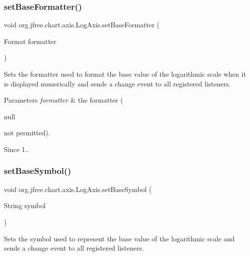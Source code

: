 \subsubsection{\texorpdfstring{set\+Base\+Formatter()}{setBaseFormatter()}}
{\footnotesize\ttfamily void org.\+jfree.\+chart.\+axis.\+Log\+Axis.\+set\+Base\+Formatter (\begin{DoxyParamCaption}\item[{Format}]{formatter }\end{DoxyParamCaption})}

Sets the formatter used to format the base value of the logarithmic scale when it is displayed numerically and sends a change event to all registered listeners.


\begin{DoxyParams}{Parameters}
{\em formatter} & the formatter (
\begin{DoxyCode}
null 
\end{DoxyCode}
 not permitted).\\
\hline
\end{DoxyParams}
\begin{DoxySince}{Since}
1.. 
\end{DoxySince}
\mbox{\label{classorg_1_1jfree_1_1chart_1_1axis_1_1_log_axis_ab0f13ef969ce11fbada0e7b9d0d86c16}} 
\subsubsection{\texorpdfstring{set\+Base\+Symbol()}{setBaseSymbol()}}
{\footnotesize\ttfamily void org.\+jfree.\+chart.\+axis.\+Log\+Axis.\+set\+Base\+Symbol (\begin{DoxyParamCaption}\item[{String}]{symbol }\end{DoxyParamCaption})}

Sets the symbol used to represent the base value of the logarithmic scale and sends a change event to all registered listeners.


